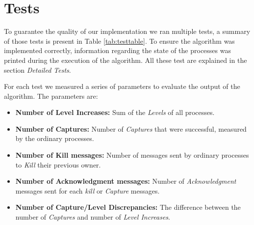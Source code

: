 \section*{Tests}

	\vspace{10pt}

	\indent To guarantee the quality of our implementation we ran multiple tests, a summary of those tests is present in Table \ref{tab:testtable}. To ensure the algorithm was implemented correctly, information regarding the state of the processes was printed during the execution of the algorithm. All these test are explained in the section \textit{Detailed Tests}.

	For each test we measured a series of parameters to evaluate the output of the algorithm. The parameters are:

	\begin{itemize}
		\item{\textbf{Number of Level Increases:}} Sum of the \textit{Levels} of all processes. 
		\item{\textbf{Number of Captures:}} Number of \textit{Captures} that were successful, measured by the ordinary processes.
		\item{\textbf{Number of Kill messages:}} Number of messages sent by ordinary processes to \textit{Kill} their previous owner.
		\item{\textbf{Number of Acknowledgment messages:}} Number of \textit{Acknowledgment} messages sent for each \textit{kill} or \textit{Capture} messages.
		\item{\textbf{Number of Capture/Level Discrepancies:}} The difference between the number of \textit{Captures} and number of \textit{Level Increases}.

	\end{itemize}

